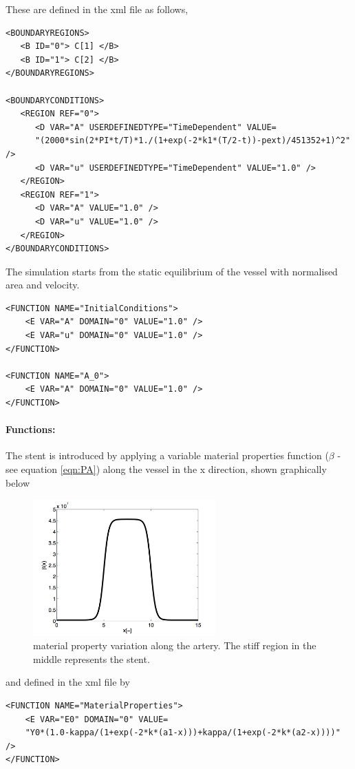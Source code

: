 These are defined in the xml file as follows,
\begin{lstlisting}[style=XMLStyle] 
<BOUNDARYREGIONS>
   <B ID="0"> C[1] </B>
   <B ID="1"> C[2] </B>
</BOUNDARYREGIONS>

<BOUNDARYCONDITIONS>
   <REGION REF="0">
      <D VAR="A" USERDEFINEDTYPE="TimeDependent" VALUE=
      "(2000*sin(2*PI*t/T)*1./(1+exp(-2*k1*(T/2-t))-pext)/451352+1)^2" />
      <D VAR="u" USERDEFINEDTYPE="TimeDependent" VALUE="1.0" />
   </REGION>
   <REGION REF="1">
      <D VAR="A" VALUE="1.0" />
      <D VAR="u" VALUE="1.0" />
   </REGION>
</BOUNDARYCONDITIONS>
\end{lstlisting}

The simulation starts from the static equilibrium of the vessel with normalised area and velocity.
\begin{lstlisting}[style=XMLStyle] 
<FUNCTION NAME="InitialConditions">
	<E VAR="A" DOMAIN="0" VALUE="1.0" />
	<E VAR="u" DOMAIN="0" VALUE="1.0" />
</FUNCTION>
        
<FUNCTION NAME="A_0">
	<E VAR="A" DOMAIN="0" VALUE="1.0" />
</FUNCTION>
\end{lstlisting}

\paragraph{Functions:~} The stent is introduced by applying a variable material properties function ($\beta$ - see equation \ref{eqn:PA}) along the vessel in the x direction, shown graphically below
\begin{figure}
\begin{center}
\includegraphics[width=7cm]{Figures/StentMaterial.png}
\caption{material property variation along the artery. The stiff region in the middle represents the stent.}
\end{center}
\end{figure}
and defined in the xml file by
\begin{lstlisting}[style=XMLStyle] 
<FUNCTION NAME="MaterialProperties"> 
	<E VAR="E0" DOMAIN="0" VALUE=
	"Y0*(1.0-kappa/(1+exp(-2*k*(a1-x)))+kappa/(1+exp(-2*k*(a2-x))))" />     	
</FUNCTION>
\end{lstlisting}

